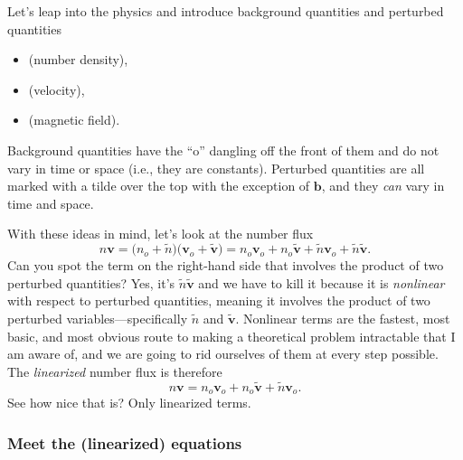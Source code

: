 Let's leap into the physics and introduce background quantities and perturbed quantities \par
\begin{itemize}
\item {} (number density),
\item {} (velocity),
\item {} (magnetic field).
\end{itemize}
Background quantities have the ``o'' dangling off the front of them and do not
vary in time or space (i.e., they are constants). Perturbed quantities are all
marked with a tilde over the top with the exception of $\mathbf{b}$, and they
\emph{can} vary in time and space.

With these ideas in mind, let's look at the number flux
\begin{equation}
  n \mathbf{v} = \Big ( n_o + \tilde n \Big ) \Big ( \mathbf{v}_o + \mathbf{\tilde v} \Big ) = n_o \mathbf{v}_o + n_o \mathbf{\tilde v} + \tilde n \mathbf{v}_o + \tilde n \mathbf{\tilde v}.
\end{equation}
Can you spot the term on the right-hand side that involves the product of two
perturbed quantities? Yes, it's $\tilde n \mathbf{\tilde v}$ and we have to kill
it because it is \emph{nonlinear} with respect to perturbed quantities, meaning
it involves the product of two perturbed variables---specifically $\tilde n$ and
$\mathbf{\tilde v}$. Nonlinear terms are the fastest, most basic, and most
obvious route to making a theoretical problem intractable that I am aware of,
and we are going to rid ourselves of them at every step possible. The
\emph{linearized} number flux is therefore
\begin{equation}
  n \mathbf{v} = n_o \mathbf{v}_o + n_o \mathbf{\tilde v} + \tilde n \mathbf{v}_o.
\end{equation}
See how nice that is? Only linearized terms.

\subsubsection{Meet the (linearized) equations}

